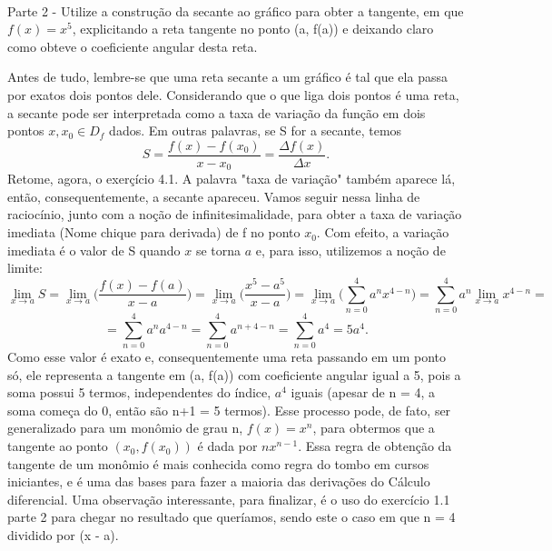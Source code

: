 \documentclass[exercícios_de_cálculo.tex]{subfiles}
\begin{document}
\paragraph{} Parte 2 - Utilize a construção da secante ao gráfico para obter a tangente, em que $f(x) = x^5$, explicitando a reta tangente no ponto (a, f(a)) e deixando claro como obteve o coeficiente angular desta reta.
\begin{sol*}
	Antes de tudo, lembre-se que uma reta secante a um gráfico é tal que ela passa por exatos dois pontos dele. Considerando que o que liga dois pontos é uma reta, a secante pode ser interpretada como a taxa de variação da função em dois pontos $x, x_0\in{D_f}$ dados. Em outras palavras, se S for a secante, temos
	$$
		S = \frac{f(x) - f(x_0)}{x - x_0} = \frac{\Delta{f(x)}}{\Delta{x}}.
	$$
	Retome, agora, o exerçício 4.1. A palavra "taxa de variação" também aparece lá, então, consequentemente, a secante apareceu. Vamos seguir nessa linha de racioc\'inio, junto com a noç\~ao de infinitesimalidade, para obter a taxa de variaç\~ao imediata (Nome chique para derivada) de f no ponto $x_0$. Com efeito, a variaç\~ao imediata é o valor de S quando $x$ se torna $a$ e, para isso, utilizemos a noç\~ao de limite:
	$$
		\lim_{x\to{a}} S = \lim_{x\to{a}}\biggl(\frac{f(x) - f(a)}{x - a}\biggr) = \lim_{x\to{a}}\biggl(\frac{x^5 - a^5}{x - a}\biggr) = \lim_{x\to{a}}\biggl(\sum_{n=0}^{4}a^nx^{4-n}\biggr) = \sum_{n=0}^{4}a^n\lim_{x\to{a}}x^{4-n}=
	$$
	$$
		= \sum_{n=0}^{4}a^na^{4-n} = \sum_{n=0}^{4}a^{n+4-n} = \sum_{n=0}^{4}a^4 = 5a^4 .
	$$
	Como esse valor é exato e, consequentemente uma reta passando em um ponto só, ele representa a tangente em (a, f(a)) com coeficiente angular igual a 5, pois a soma possui 5 termos, independentes do índice, $a^4$ iguais (apesar de n = 4, a soma começa do 0, então são n+1 = 5 termos). Esse processo pode, de fato, ser generalizado para um monômio de grau n, $f(x) = x^n$, para obtermos que a tangente ao ponto $(x_0, f(x_0))$ é dada por $nx^{n-1}.$ Essa regra de obtenç\~ao da tangente de um monômio é mais conhecida como regra do tombo em cursos iniciantes, e é uma das bases para fazer a maioria das derivações do Cálculo diferencial. Uma observaç\~ao interessante, para finalizar, é o uso do exerc\'icio 1.1 parte 2 para chegar no resultado que quer\'iamos, sendo este o caso em que n = 4 dividido por (x - a).
	\qedsymbol
\end{sol*}
\end{document}
